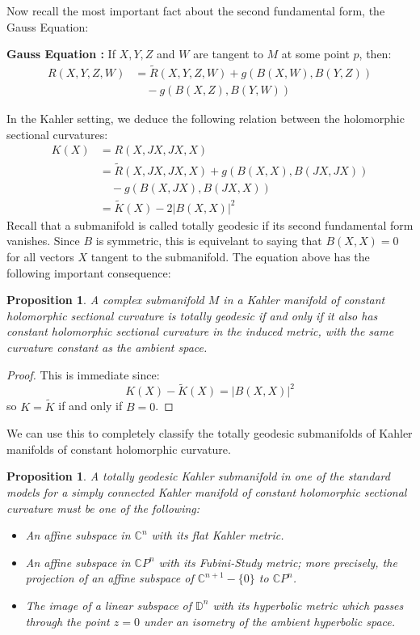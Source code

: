 \documentclass[11pt]{amsart}
\newtheorem{prop}[subsection]{Proposition}
\def \Ramb{ \tilde{R} }
\def \Kamb{ \tilde{K} }
\def \CP{ \mathbb{C}P }
\def \C{ \mathbb{C} }
\def \disk{ \mathbb{D} }
\theoremstyle{definition}
\begin{document}
Now recall the most important fact about the second fundamental form, the Gauss Equation:

{ \bf Gauss Equation : } If $X,Y,Z$ and $W$ are tangent to $M$ at some point $p$, then:
%
\begin{align*}
 R(X,Y,Z,W) &= \Ramb (X,Y,Z,W) + g( B(X,W), B(Y,Z) ) \\
& \quad - g( B(X,Z), B(Y,W) ) 
\end{align*}

In the Kahler setting, we deduce the following relation between the holomorphic sectional curvatures:
%
\begin{align*}
K(X) &= R(X,JX,JX,X) \\
&= \Ramb (X,JX,JX,X) + g( B(X,X), B(JX,JX) ) \\
& \quad - g( B(X,JX), B(JX,X) ) \\
&= \Kamb (X) - 2 | B(X,X) |^2
\end{align*}
%
Recall that a submanifold is called totally geodesic if its second fundamental form vanishes.  Since $B$ is symmetric, this is equivelant to saying that $B(X,X) = 0$ for all vectors $X$ tangent to the submanifold.  The equation above has the following important consequence:

\begin{prop}
A complex submanifold $M$ in a Kahler manifold of constant holomorphic sectional curvature is totally geodesic if and only if it also has constant holomorphic sectional curvature in the induced metric, with the same curvature constant as the ambient space.
\end{prop}

\begin{proof}
This is immediate since:
%
$$ K(X) - \Kamb (X) = |B(X,X)|^2 $$
%
so $K = \Kamb$ if and only if $B = 0$.
\end{proof}

We can use this to completely classify the totally geodesic submanifolds of Kahler manifolds of constant holomorphic curvature.

\begin{prop}  A totally geodesic Kahler submanifold in one of the standard models for a simply connected Kahler manifold of constant holomorphic sectional curvature must be one of the following:
%
\begin{itemize}
%
\item An affine subspace in $\C^n$ with its flat Kahler metric.
\item An affine subspace in $\CP^n$ with its Fubini-Study metric; more precisely, the projection of an affine subspace of $\C^{n+1} - \{0\}$ to $\CP^n$.
\item The image of a linear subspace of $\disk^n$ with its hyperbolic metric which passes through the point $z = 0$ under an isometry of the ambient hyperbolic space.
%
\end{itemize}
%
\end{prop}
\end{document}
